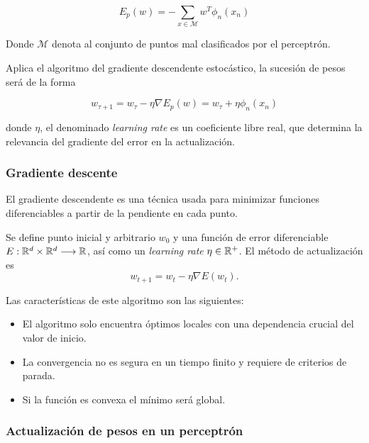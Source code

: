 \begin{equation}
    E_p(w) = - \sum_{x \in \mathcal M} w^T \phi_n (x_n)
\end{equation}

Donde $\mathcal M$ denota al conjunto de puntos mal clasificados por el perceptrón.

Aplica el algoritmo del gradiente descendente estocástico, la sucesión de pesos será de la forma

\begin{equation}
    w_{\tau+1} = 
    w_{\tau} - \eta \nabla E_p(w)
     = 
     w_{\tau} + \eta \phi_n (x_n)
\end{equation}

donde $\eta$, el denominado  \textit{learning rate}
es un coeficiente libre real, que determina la relevancia del gradiente del error en la actualización. 

\subsubsection{Gradiente descente}  

El gradiente descendente es una técnica usada para minimizar funciones diferenciables
a partir de la pendiente en cada punto. 

Se define punto inicial y arbitrario $w_0$ y una función de error diferenciable
$E: \mathbb{R}^d \times \mathbb{R}^d \longrightarrow \mathbb{R}$, así como un \textit{learning rate} 
$\eta \in \mathbb{R}^+$. 
El método de actualización es 
\begin{equation}
    w_{t+1}  = w_t - \eta \nabla E(w_t).
\end{equation}

Las características de este algoritmo son las siguientes: 

\begin{itemize}
    \item El algoritmo solo encuentra óptimos locales con una dependencia crucial del valor de inicio. 
    \item La convergencia no es segura en un tiempo finito y requiere de criterios de parada. 
    \item Si la función es convexa el mínimo será global. 
\end{itemize}

\subsubsection{Actualización de pesos en un perceptrón }











